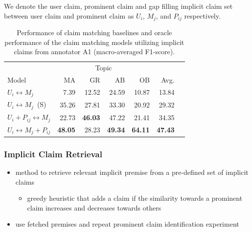 \documentclass{beamer}
\begin{document}
\begin{frame}

We denote the user claim, prominent claim and gap filling implicit claim set between 
user claim and prominent claim as
$U_i$, $M_j$, and $P_{ij}$ respectively. 

\begin{table}
\begin{center}
{\small
\setlength{\tabcolsep}{5.9pt}
\begin{tabular}{lrrrrrr}
\toprule
&\multicolumn{4}{c}{Topic}\\
\cmidrule(lr){2-5}
Model & MA & GR  & AB & OB & Avg. \\
\midrule
$U_i \leftrightarrow M_j$      & 7.39          & 12.52        & 24.59        & 10.87        & 13.84 \\
$U_i \leftrightarrow M_j$\ (S)  & 35.26         & 27.81        & 33.30        & 20.92        & 29.32 \\
$U_i + P_{ij} \leftrightarrow M_j$   & 22.73         & {\bf 46.03}  & 47.22        & 21.41        & 34.35 \\
$U_i \leftrightarrow M_j + P_{ij} $ & {\bf 48.05}   & 28.23        & {\bf 49.34}  & {\bf 64.11}  & {\bf 47.43} \\
\bottomrule
\end{tabular}}
\caption{Performance of claim matching baselines and oracle performance of the
claim matching models utilizing implicit claims from annotator A1
(macro-averaged F1-score).}
\label{tab:argpremise_matching}
\end{center}
\end{table}

\end{frame}

\begin{frame}
	\frametitle{Implicit Claim Retrieval}

	\begin{itemize}
		\item method to retrieve relevant implicit premise
			from a pre-defined set of implicit claims
		\begin{itemize}
			\item greedy heuristic that adds a claim if the similarity towards
				a prominent claim increases and decreases towards others
		\end{itemize}
	\item use fetched premises and repeat prominent claim identification experiment
	\end{itemize}

\end{frame}
\end{document}
